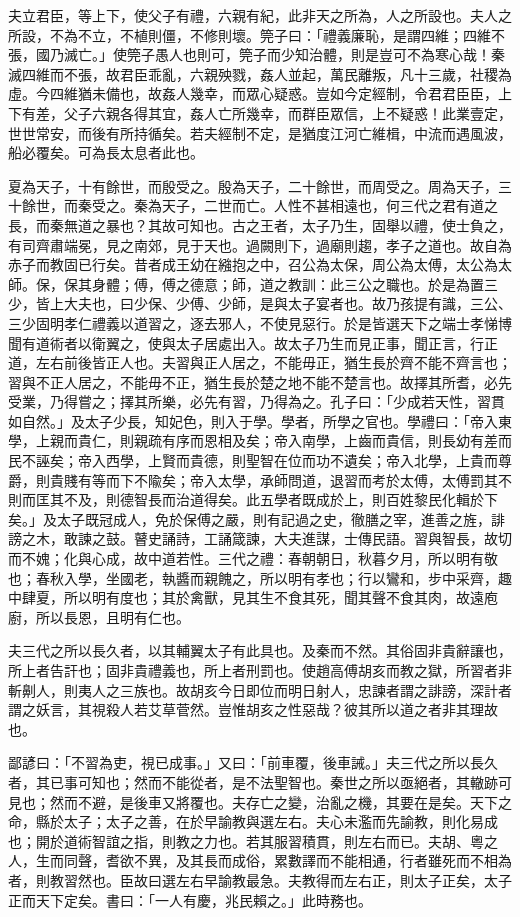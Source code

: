 \begin{pinyinscope}
夫立君臣，等上下，使父子有禮，六親有紀，此非天之所為，人之所設也。夫人之所設，不為不立，不植則僵，不修則壞。筦子曰：「禮義廉恥，是謂四維；四維不張，國乃滅亡。」使筦子愚人也則可，筦子而少知治體，則是豈可不為寒心哉！秦滅四維而不張，故君臣乖亂，六親殃戮，姦人並起，萬民離叛，凡十三歲，社稷為虛。今四維猶未備也，故姦人幾幸，而眾心疑惑。豈如今定經制，令君君臣臣，上下有差，父子六親各得其宜，姦人亡所幾幸，而群臣眾信，上不疑惑！此業壹定，世世常安，而後有所持循矣。若夫經制不定，是猶度江河亡維楫，中流而遇風波，船必覆矣。可為長太息者此也。

夏為天子，十有餘世，而殷受之。殷為天子，二十餘世，而周受之。周為天子，三十餘世，而秦受之。秦為天子，二世而亡。人性不甚相遠也，何三代之君有道之長，而秦無道之暴也？其故可知也。古之王者，太子乃生，固舉以禮，使士負之，有司齊肅端冕，見之南郊，見于天也。過闕則下，過廟則趨，孝子之道也。故自為赤子而教固已行矣。昔者成王幼在繈抱之中，召公為太保，周公為太傅，太公為太師。保，保其身體；傅，傅之德意；師，道之教訓：此三公之職也。於是為置三少，皆上大夫也，曰少保、少傅、少師，是與太子宴者也。故乃孩提有識，三公、三少固明孝仁禮義以道習之，逐去邪人，不使見惡行。於是皆選天下之端士孝悌博聞有道術者以衛翼之，使與太子居處出入。故太子乃生而見正事，聞正言，行正道，左右前後皆正人也。夫習與正人居之，不能毋正，猶生長於齊不能不齊言也；習與不正人居之，不能毋不正，猶生長於楚之地不能不楚言也。故擇其所耆，必先受業，乃得嘗之；擇其所樂，必先有習，乃得為之。孔子曰：「少成若天性，習貫如自然。」及太子少長，知妃色，則入于學。學者，所學之官也。學禮曰：「帝入東學，上親而貴仁，則親疏有序而恩相及矣；帝入南學，上齒而貴信，則長幼有差而民不誣矣；帝入西學，上賢而貴德，則聖智在位而功不遺矣；帝入北學，上貴而尊爵，則貴賤有等而下不隃矣；帝入太學，承師問道，退習而考於太傅，太傅罰其不則而匡其不及，則德智長而治道得矣。此五學者既成於上，則百姓黎民化輯於下矣。」及太子既冠成人，免於保傅之嚴，則有記過之史，徹膳之宰，進善之旌，誹謗之木，敢諫之鼓。瞽史誦詩，工誦箴諫，大夫進謀，士傳民語。習與智長，故切而不媿；化與心成，故中道若性。三代之禮：春朝朝日，秋暮夕月，所以明有敬也；春秋入學，坐國老，執醬而親餽之，所以明有孝也；行以鸞和，步中采齊，趣中肆夏，所以明有度也；其於禽獸，見其生不食其死，聞其聲不食其肉，故遠庖廚，所以長恩，且明有仁也。

夫三代之所以長久者，以其輔翼太子有此具也。及秦而不然。其俗固非貴辭讓也，所上者告訐也；固非貴禮義也，所上者刑罰也。使趙高傅胡亥而教之獄，所習者非斬劓人，則夷人之三族也。故胡亥今日即位而明日射人，忠諫者謂之誹謗，深計者謂之妖言，其視殺人若艾草菅然。豈惟胡亥之性惡哉？彼其所以道之者非其理故也。

鄙諺曰：「不習為吏，視已成事。」又曰：「前車覆，後車誡。」夫三代之所以長久者，其已事可知也；然而不能從者，是不法聖智也。秦世之所以亟絕者，其轍跡可見也；然而不避，是後車又將覆也。夫存亡之變，治亂之機，其要在是矣。天下之命，縣於太子；太子之善，在於早諭教與選左右。夫心未濫而先諭教，則化易成也；開於道術智誼之指，則教之力也。若其服習積貫，則左右而已。夫胡、粵之人，生而同聲，耆欲不異，及其長而成俗，累數譯而不能相通，行者雖死而不相為者，則教習然也。臣故曰選左右早諭教最急。夫教得而左右正，則太子正矣，太子正而天下定矣。書曰：「一人有慶，兆民賴之。」此時務也。


\end{pinyinscope}
